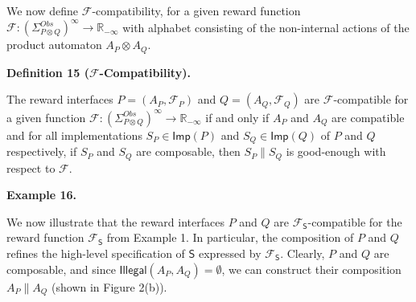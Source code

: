 \documentclass[10pt,a4paper]{article}
\begin{document}
 
 
We now define $\mathcal{F}$-compatibility, for a given reward function $\mathcal{F}:(\Sigma_{P\otimes Q}^{Obs})^{\infty}\to\mathbb{R}_{-\infty}$ with alphabet consisting of the non-internal actions of the product automaton $A_{P}\otimes A_{Q}$.\par
 
 
 
\par\medskip\noindent\textbf{Definition 15 ($\mathcal{F}$-Compatibility).}\par
 
 
The reward interfaces $P=(A_{P},\mathcal{F}_{P})$ and $Q=(A_{Q},\mathcal{F}_{Q})$ are $\mathcal{F}$-compatible for a given function $\mathcal{F}:(\Sigma_{P\otimes Q}^{Obs})^{\infty}\to\mathbb{R}_{-\infty}$ if and only if $A_{P}$ and $A_{Q}$ are compatible and for all implementations $S_{P}\in\mathsf{Imp}(P)$ and $S_{Q}\in\mathsf{Imp}(Q)$ of $P$ and $Q$ respectively, if $S_{P}$ and $S_{Q}$ are composable, then $S_{P}\parallel S_{Q}$ is good-enough with respect to $\mathcal{F}$.\par
 
 
 
 
\par\medskip\noindent\textbf{Example 16.}\par
 
 
We now illustrate that the reward interfaces $P$ and $Q$ are $\mathcal{F}_{\mathsf{S}}$-compatible for the reward function $\mathcal{F}_{\mathsf{S}}$ from Example 1. In particular, the composition of $P$ and $Q$ refines the high-level specification of $\mathsf{S}$ expressed by $\mathcal{F}_{\mathsf{S}}$. Clearly, $P$ and $Q$ are composable, and since $\mathsf{Illegal}(A_{P},A_{Q})=\emptyset$, we can construct their composition $A_{P}\parallel A_{Q}$ (shown in Figure 2(b)).\par
 
 
 
\end{document}
